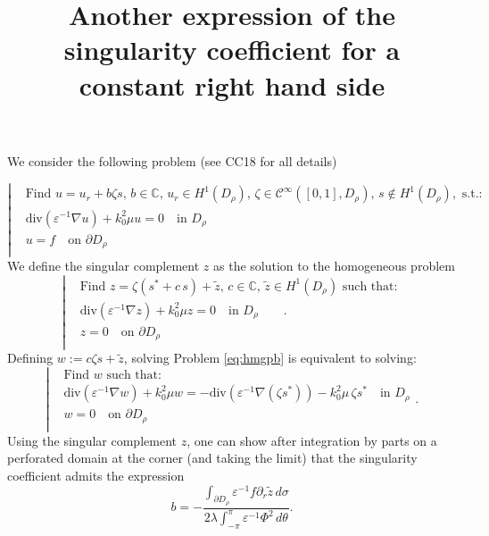 \documentclass[11pt]{article}
\theoremstyle{plain}
\begin{document}

\title{Another expression of the singularity coefficient for a constant right hand side}
\maketitle

We consider the following problem (see CC18 for all details)

\begin{equation}\label{eq:toypb}
\left|
\begin{aligned}
&\text{Find } u = u_r + b \zeta s, \, b \in \mathbb{C}, \, u_r \in H^1(D_\rho), \, \zeta \in \mathcal{C}^\infty ([0,1],D_\rho), \, s \not \in  H^1(D_\rho), \text{ s.t.:} \\
&\displaystyle\text{div}\left(\varepsilon^{-1}\nabla u \right) + {k_0^2} \mu  u = 0 \quad \text{in } D_\rho \\
& u = f \quad \text{on } \partial D_\rho \\
\end{aligned}
\right.
\end{equation}
We define the singular complement $z$ as the solution to the homogeneous problem 
\begin{equation}\label{eq:hmgpb}
\left|
\begin{aligned}
& \mbox{Find } z = \zeta  \left( s^\ast + c\, s\right)  + \tilde{z}, \, c \in \mathbb{C}, \, \tilde{z}\in H^1(D_\rho) \mbox{ such that:}\\
&\displaystyle\mathrm{div}\left(\varepsilon^{-1}\nabla z \right) + {k_0^2} \mu  z = 0 \quad \text{in } D_\rho  \qquad .\\
& z = 0 \quad \text{on } \partial D_\rho \\
\end{aligned}
\right.
\end{equation}
Defining $w:= c \zeta s + \tilde{z}$, solving Problem \eqref{eq:hmgpb} is equivalent to solving:
\begin{equation}\label{eq:newpb}
\left|
\begin{aligned}
& \mbox{Find } w \mbox{ such that:} \\
&\displaystyle\text{div}\left(\varepsilon^{-1}\nabla w \right) + {k_0^2} \mu  w =  - \text{div}(\varepsilon^{-1} \nabla (\zeta  s^\ast ))  - k^2_0 \mu\, \zeta s^\ast \quad \text{in } D_\rho \\
& w = 0 \quad \text{on } \partial D_\rho \\
\end{aligned}
\right.
.
\end{equation}
Using the singular complement $z$, one can show after integration by parts on a perforated domain at the corner (and taking the limit) that the singularity coefficient admits the expression
\begin{equation}\label{eq:coeff_b}
b =- \displaystyle   \frac{\displaystyle  \int_{\partial D_\rho} \varepsilon^{-1}  f \partial_r \tilde{z}\, d\sigma}{2  \lambda \displaystyle \int_{-\pi}^{\pi} \varepsilon^{-1} \Phi^2\, d\theta}.
\end{equation}
\end{document}
